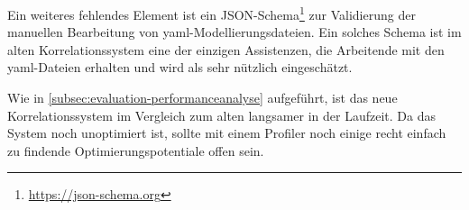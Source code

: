 Ein weiteres fehlendes Element ist ein JSON-Schema\footnote{\url{https://json-schema.org}} zur Validierung der manuellen Bearbeitung von \acrshort{yaml}-Modellierungsdateien.
Ein solches Schema ist im alten Korrelationssystem eine der einzigen Assistenzen, die Arbeitende mit den \acrshort{yaml}-Dateien erhalten und wird als sehr nützlich eingeschätzt.

Wie in \autoref{subsec:evaluation-performanceanalyse} aufgeführt, ist das neue Korrelationssystem im Vergleich zum alten langsamer in der Laufzeit.
Da das System noch unoptimiert ist, sollte mit einem Profiler noch einige recht einfach zu findende Optimierungspotentiale offen sein.
